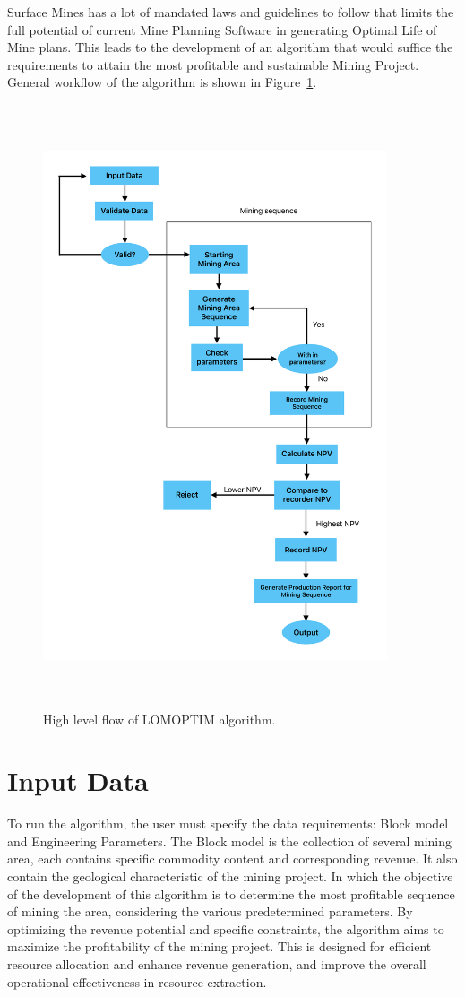 \documentclass[12pt]{report}
\begin{document}
Surface Mines has a lot of mandated laws and guidelines to follow that limits the full potential of current Mine Planning Software in generating Optimal Life of Mine plans.
This leads to the development of an algorithm that would suffice the requirements to attain the most profitable and sustainable Mining Project. 
General workflow of the algorithm is shown in Figure~\ref{fig:PFLomoptim}.

\begin{figure}[p]
    \centering
    \includegraphics[width=4in,height=7in]{img/PFLomoptim.pdf}
    \caption{High level flow of LOMOPTIM algorithm.}
    \label{fig:PFLomoptim}
\end{figure}

\section{Input Data}

To run the algorithm, the user must specify the data requirements: Block model and Engineering Parameters.
The Block model is the collection of several mining area, each contains specific commodity content and corresponding revenue. 
It also contain the geological characteristic of the mining project. In which the objective of the development of this algorithm is to determine the most profitable sequence of mining the area, considering the various predetermined parameters. By optimizing the revenue potential and specific constraints, the algorithm aims to maximize the profitability of the mining project. 
This is designed for efficient resource allocation and enhance revenue generation, and improve the overall operational effectiveness in resource extraction.
\end{document}
